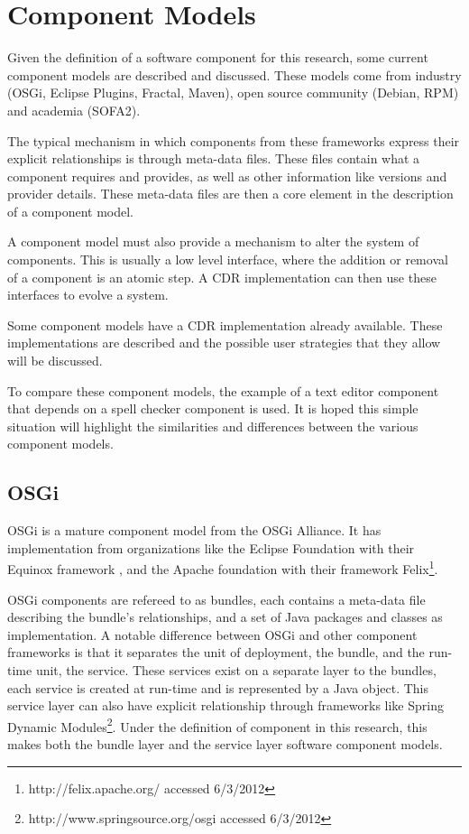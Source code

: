 \section{Component Models}
\label{background.models}
Given the definition of a software component for this research, some current component models are described and discussed.
These models come from industry (OSGi, Eclipse Plugins, Fractal, Maven), open source community (Debian, RPM) and academia (SOFA2).

The typical mechanism in which components from these frameworks express their explicit relationships is through meta-data files.
These files contain what a component requires and provides, as well as other information like versions and provider details.
These meta-data files are then a core element in the description of a component model.

A component model must also provide a mechanism to alter the system of components.
This is usually a low level interface, where the addition or removal of a component is an atomic step.
A CDR implementation can then use these interfaces to evolve a system.

Some component models have a CDR implementation already available.
These implementations are described and the possible user strategies that they allow will be discussed. 

To compare these component models, the example of a text editor component that depends on a spell checker component is used.
It is hoped this simple situation will highlight the similarities and differences between the various component models.

\subsection{OSGi}
OSGi is a mature component model from the OSGi Alliance.
It has implementation from organizations like the Eclipse Foundation with their Equinox framework \citep{mcaffer2010osgi}, 
and the Apache foundation with their framework Felix\footnote{http://felix.apache.org/ accessed 6/3/2012}.

OSGi components are refereed to as bundles, each contains a meta-data file describing the bundle's relationships, and a set of Java packages and classes as implementation.
A notable difference between OSGi and other component frameworks is that it separates the unit of deployment, the bundle, and the run-time unit, the service.
These services exist on a separate layer to the bundles, each service is created at run-time and is represented by a Java object.
This service layer can also have explicit relationship through frameworks like Spring Dynamic Modules\footnote{http://www.springsource.org/osgi accessed 6/3/2012}.
Under the definition of component in this research, this makes both the bundle layer and the service layer software component models.

